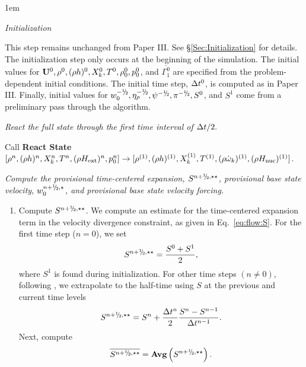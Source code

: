 \begin{description}\itemsep 1em


\item[Step 0.] {\em Initialization}

This step remains unchanged from Paper III.  See \S \ref{Sec:Initialization}
for details.  The initialization step only occurs at the beginning of the simulation.  
The initial values for ${\bf U}^0, \rho^0, (\rho h)^0, X_k^0, T^0, 
\rho_0^0, p_0^0$, and $\overline{\Gamma_1^0}$ are specified from the problem-dependent 
initial conditions.  The initial time step, $\Delta t^0$, is computed as in 
Paper III.  Finally, initial
values for $w_0^{-\myhalf}, \etarho^{-\myhalf}, \psi^{-\myhalf}, 
\pi^{-\myhalf}, S^0$, and $S^1$ come from a preliminary pass through
the algorithm.  

\item[Step 1.] {\em React the full state through the first time interval of $\Delta t / 2.$}

Call {\bf React State}$[\rho^n, (\rho h)^n, X_k^n, T^n, (\rho{H_{\rm ext}})^n, p_0^n]
 \rightarrow [\rho^{(1)},(\rho h)^{(1)},X_k^{(1)},T^{(1)},(\rho \dot{\omega}_k)^{(1)},(\rho {H_{\rm nuc}})^{(1)}]$.


\item[Step 2.] {\em Compute the provisional time-centered expansion,
  $S^{\nph,\star\star}$, provisional base state velocity,
  $w_0^{\nph,\star}$, and provisional base state velocity forcing.}

\begin{enumerate}
\renewcommand{\theenumi}{{\bf \Alph{enumi}}}

\item Compute $S^{\nph,\star\star}$.  We compute an estimate for the
  time-centered expansion term in the velocity divergence constraint,
  as given in Eq.~\ref{eq:flow:S}.  For the first time step ($n=0$),
  we set
\begin{equation}
S^{n+\myhalf,\star\star} = \frac{S^0 + S^1}{2},
\end{equation}
  where $S^1$ is found during initialization.  For other time steps
  $(n \ne 0)$, following \cite{SNe}, we extrapolate
  to the half-time using $S$ at the previous and current
  time levels
\begin{equation}
S^{\nph,\star\star} = S^n + \frac{\dt^n}{2} \frac{S^n - S^{n-1}}{\dt^{n-1}}.
\end{equation}
  Next, compute
\begin{equation}
\overline{S^{\nph,\star\star}} = {\mathrm{\bf Avg}} \left(S^{\nph,\star\star}\right).
\end{equation}


\end{enumerate}
\end{description}
